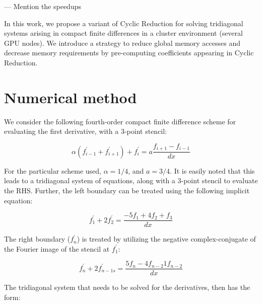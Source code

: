 \documentclass{article}
\begin{document}
    --- Mention the speedups

    In this work, we propose a variant of Cyclic Reduction for solving
    tridiagonal systems arising in compact finite differences
    in a cluster environment (several GPU nodes).
    We introduce a strategy to
    reduce global memory accesses and decrease memory requirements by
    pre-computing coefficients appearing in Cyclic Reduction.


\section{Numerical method}

    We consider the following fourth-order
    compact finite difference scheme for evaluating the first derivative,
    with a 3-point stencil:

    \begin{equation}
        \alpha(f^{\prime}_{i-1} + f^{\prime}_{i+1}) + f^{\prime}_i
        =
        a\frac{f_{i+1} - f_{i-1}}{dx}
    \end{equation}

    For the particular scheme used, $\alpha = 1/4$,
    and $ a = 3/4 $.
    It is easily noted that this leads to a tridiagonal system of equations,
    along with a 3-point stencil to evaluate the RHS.
    Further, the left boundary can be treated using the following implicit equation:

    \begin{equation}
        f^{\prime}_1 + 2f^{\prime}_2 = \frac{-5f_1 + 4f_2 + f_3}{dx}
    \end{equation}

    The right boundary ($f^{\prime}_{n}$) is treated by utilizing
    the negative complex-conjugate of the Fourier image of the stencil
    at $f^{\prime}_1$:

    \begin{equation}
        f^{\prime}_{n} + 2f^{\prime}_{n-1s}
        =
        \frac{5f_{n} - 4f_{n-2} 1 f_{n-2}}{dx}
    \end{equation}

    The tridiagonal system that needs to be solved for the derivatives,
    then has the form:
\end{document}

